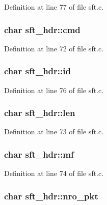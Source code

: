 Definition at line 77 of file sft.c.

\hypertarget{structsft__hdr_ab60765ff033657730f7b034d4b8a9f88}{
\subsubsection[{cmd}]{\setlength{\rightskip}{0pt plus 5cm}char {\bf sft\_\-hdr::cmd}}}
\label{structsft__hdr_ab60765ff033657730f7b034d4b8a9f88}


Definition at line 72 of file sft.c.

\hypertarget{structsft__hdr_a63dce22de86fc545eb00e4f6d3c2ba3d}{
\subsubsection[{id}]{\setlength{\rightskip}{0pt plus 5cm}char {\bf sft\_\-hdr::id}}}
\label{structsft__hdr_a63dce22de86fc545eb00e4f6d3c2ba3d}


Definition at line 76 of file sft.c.

\hypertarget{structsft__hdr_a31b3e7b8cb3009491ba6358f4ff005c6}{
\subsubsection[{len}]{\setlength{\rightskip}{0pt plus 5cm}char {\bf sft\_\-hdr::len}}}
\label{structsft__hdr_a31b3e7b8cb3009491ba6358f4ff005c6}


Definition at line 73 of file sft.c.

\hypertarget{structsft__hdr_a8bbe50f01aadaeba7c765e3cc8191195}{
\subsubsection[{mf}]{\setlength{\rightskip}{0pt plus 5cm}char {\bf sft\_\-hdr::mf}}}
\label{structsft__hdr_a8bbe50f01aadaeba7c765e3cc8191195}


Definition at line 74 of file sft.c.

\hypertarget{structsft__hdr_a5707c36204763f68f1c11f3096819e24}{
\subsubsection[{nro\_\-pkt}]{\setlength{\rightskip}{0pt plus 5cm}char {\bf sft\_\-hdr::nro\_\-pkt}}}
\label{structsft__hdr_a5707c36204763f68f1c11f3096819e24}


